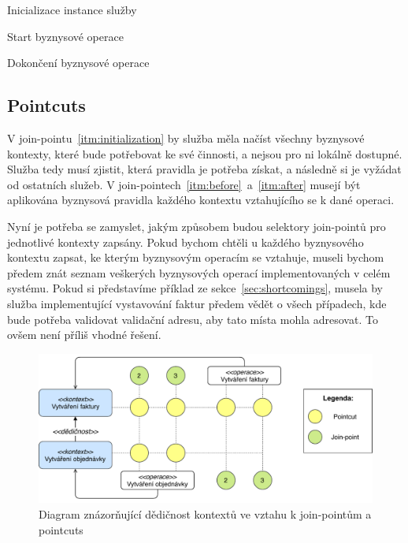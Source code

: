 \benum[label=\circledarabic]
\item\label{itm:initialization} Inicializace instance služby
\item\label{itm:before} Start byznysové operace
\item\label{itm:after} Dokončení byznysové operace
\eenum

\subsection{Pointcuts}

V join-pointu~\ref{itm:initialization} by služba měla načíst všechny byznysové kontexty, které
bude potřebovat ke své činnosti, a nejsou pro ni lokálně dostupné. Služba tedy musí zjistit,
která pravidla je potřeba získat, a následně si je vyžádat od ostatních služeb.
V join-pointech~\ref{itm:before}~a~\ref{itm:after} musejí být aplikována byznysová pravidla každého
kontextu vztahujícího se k dané operaci.

Nyní je potřeba se zamyslet, jakým způsobem budou selektory join-pointů pro jednotlivé kontexty zapsány.
Pokud bychom chtěli u každého byznysového kontextu zapsat, ke kterým byznysovým operacím se vztahuje,
museli bychom předem znát seznam veškerých byznysových operací implementovaných v celém systému. Pokud si
představíme příklad ze sekce~\ref{sec:shortcomings}, musela by služba implementující vystavování
faktur předem vědět o všech případech, kde bude potřeba validovat validační adresu, aby tato místa mohla
adresovat. To ovšem není příliš vhodné řešení.

\begin{figure}
    \centering
    \includegraphics[keepaspectratio=true, width=1\linewidth]{figures/context-extension.pdf}
    \caption{Diagram znázorňující dědičnost kontextů ve vztahu k join-pointům a pointcuts}
    \label{fig:context-extension}
\end{figure}

